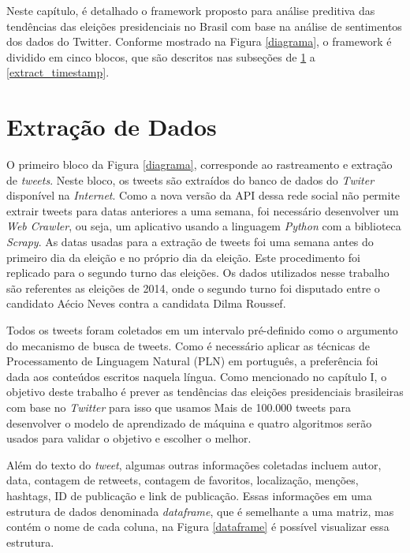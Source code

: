 Neste capítulo, é detalhado o framework proposto para análise
preditiva das tendências das eleições presidenciais no Brasil
com base na análise de sentimentos dos dados do Twitter.
Conforme mostrado na Figura \ref{diagrama}, o framework é dividido em
cinco blocos, que são descritos nas subseções de \ref{extract} a \ref{extract_timestamp}.


%


\section{Extração de Dados}
\label{extract}

O primeiro bloco da Figura \ref{diagrama}, corresponde ao rastreamento
e extração de \textit{tweets}. Neste bloco, os tweets são extraídos do
banco de dados do \textit{Twiter} disponível na \textit{Internet}. Como a nova
versão da \acrshort{API} dessa rede social não permite extrair tweets para datas
anteriores a uma semana, foi necessário desenvolver um \textit{Web
Crawler}, ou seja, um aplicativo usando a linguagem \textit{Python}
com a biblioteca \textit{Scrapy}. As datas usadas para a extração de
tweets foi uma semana antes do primeiro dia da eleição e no
próprio dia da eleição. Este procedimento foi replicado para
o segundo turno das eleições. Os dados utilizados nesse trabalho são referentes as eleições de 2014, onde o segundo turno
foi disputado entre o candidato Aécio Neves contra a candidata Dilma Roussef.


Todos os tweets foram coletados em um intervalo pré-definido
como o argumento do mecanismo de busca de tweets.
Como é necessário aplicar as técnicas de Processamento de
Linguagem Natural (PLN) em português, a preferência foi
dada aos conteúdos escritos naquela língua. Como mencionado
no capítulo I, o objetivo deste trabalho é prever as tendências
das eleições presidenciais brasileiras com base no \textit{Twitter} para
isso que usamos Mais de 100.000 tweets para desenvolver o
modelo de aprendizado de máquina e quatro algoritmos serão
usados para validar o objetivo e escolher o melhor.

Além do texto do \textit{tweet}, algumas outras informações coletadas
incluem autor, data, contagem de retweets, contagem de
favoritos, localização, menções, hashtags, ID de publicação e
link de publicação. Essas informações em uma estrutura de dados denominada \textit{dataframe}, que é semelhante a uma matriz, mas contém o nome de cada 
coluna, na Figura \ref{dataframe} é possível visualizar essa estrutura.

